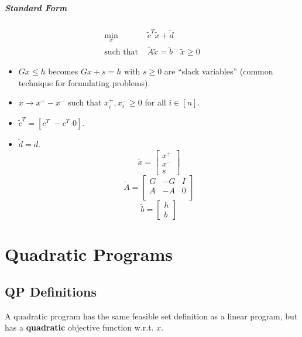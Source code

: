 \documentclass[a4paper,12pt]{report}
\begin{document}
\paragraph{Standard Form} 
\begin{align}
\min_x \,& \tilde c^T \tilde x + \tilde d \\
\text{such that }& \tilde A \tilde x = \tilde b
& \tilde x \geq 0
\end{align}

\begin{itemize}
\item $Gx \leq h$ becomes $Gx + s = h$ with $s \geq 0$ are ``slack variables'' (common technique for formulating problems). 
\item $x \to x^+ - x^-$ such that $x^+_i, x^-_i \geq 0$ for all $i \in [n]$.
\item $\tilde c^T = [c^T\,\, -c^T\,\, 0]$.
\item $\tilde d = d$.
\begin{equation}
\tilde x = \begin{bmatrix}
x^+ \\
x^- \\
s
\end{bmatrix}
\end{equation}
\begin{equation}
\tilde A = \begin{bmatrix}
G & -G & I \\
A & -A & 0 \\
\end{bmatrix}
\end{equation}
\begin{equation}
\tilde b = \begin{bmatrix}
h \\
b
\end{bmatrix}
\end{equation}
\end{itemize}




\chapter{Quadratic Programs}

\section{QP Definitions}

A quadratic program has the same feasible set definition as a linear program, but has a \textbf{quadratic} objective function w.r.t. $x$.
\end{document}
